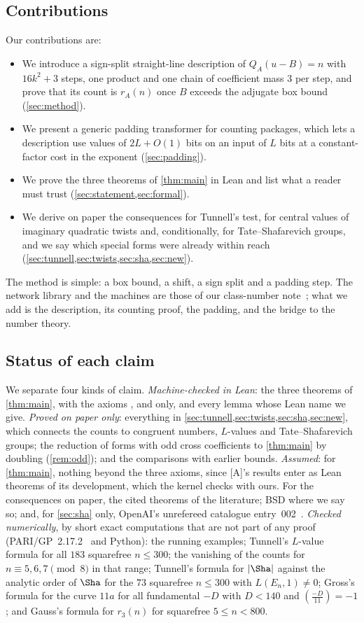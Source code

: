 \documentclass[10pt]{amsart}
\theoremstyle{plain}
\theoremstyle{definition}
\theoremstyle{remark}
\numberwithin{equation}{section}
\newcommand{\A}{\textup{[A]}}
\begin{document}
\subsection{Contributions}
Our contributions are:
\begin{itemize}
\item We introduce a sign-split straight-line description of $Q_A(u-B)=n$ with $16k^2+3$ steps, one product
and one chain of coefficient mass $3$ per step, and prove that its count is $r_A(n)$ once $B$ exceeds the
adjugate box bound (\cref{sec:method}).
\item We present a generic padding transformer for counting packages, which lets a description use values
of $2L+O(1)$ bits on an input of $L$ bits at a constant-factor cost in the exponent (\cref{sec:padding}).
\item We prove the three theorems of \cref{thm:main} in Lean and list what a reader must trust
(\cref{sec:statement,sec:formal}).
\item We derive on paper the consequences for Tunnell's test, for central values of imaginary quadratic twists
and, conditionally, for Tate--Shafarevich groups, and we say which special forms were already within reach
(\cref{sec:tunnell,sec:twists,sec:sha,sec:new}).
\end{itemize}
The method is simple: a box bound, a shift, a sign split and a padding step. The network library and the
machines are those of our class-number note~\cite{TulCN26}; what we add is the description, its counting
proof, the padding, and the bridge to the number theory.

\subsection{Status of each claim}\label{sec:status}
We separate four kinds of claim.
\emph{Machine-checked in Lean}: the three theorems of \cref{thm:main}, with the axioms ,
 and  only, and every lemma whose Lean name we give.
\emph{Proved on paper only}: everything in \cref{sec:tunnell,sec:twists,sec:sha,sec:new}, which connects the
counts to congruent numbers, $L$-values and Tate--Shafarevich groups; the reduction of forms with odd
cross coefficients to \cref{thm:main} by doubling (\cref{rem:odd}); and the comparisons with earlier bounds.
\emph{Assumed}: for \cref{thm:main}, nothing beyond the three axioms, since \A's results enter as Lean
theorems of its development, which the kernel checks with ours. For the consequences on paper, the cited
theorems of the literature; BSD where we say so; and, for \cref{sec:sha} only, OpenAI's unrefereed catalogue
entry~002~\cite{OAI002}.
\emph{Checked numerically}, by short exact computations that are not part of any proof (PARI/GP~2.17.2~\cite{PARI}
and Python): the running examples; Tunnell's $L$-value formula for all $183$ squarefree $n\le300$; the
vanishing of the counts for $n\equiv5,6,7\pmod 8$ in that range; Tunnell's formula for $|\Sha|$ against
the analytic order of $\Sha$ for the $73$ squarefree $n\le300$ with $L(E_n,1)\ne0$; Gross's formula for
the curve $11a$ for all fundamental $-D$ with $D<140$ and $(\frac{-D}{11})=-1$; and Gauss's formula for
$r_3(n)$ for squarefree $5\le n<800$.
\end{document}
